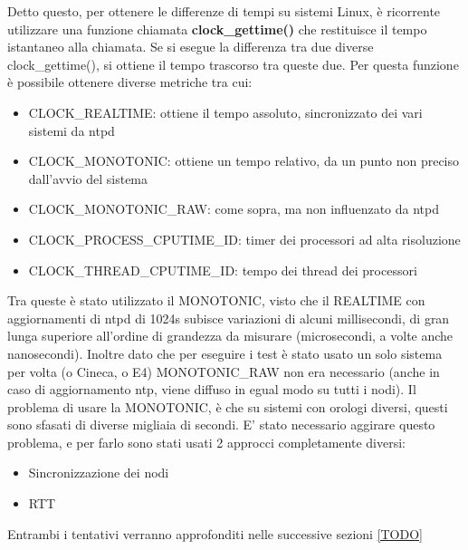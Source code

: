 Detto questo, per ottenere le differenze di tempi su sistemi Linux, è ricorrente utilizzare una funzione chiamata \textbf{clock\_gettime()} che restituisce il tempo istantaneo alla chiamata. Se si esegue la differenza tra due diverse clock\_gettime(), si ottiene il tempo trascorso tra queste due.
Per questa funzione è possibile ottenere diverse metriche tra cui:
\begin{itemize}
    \item CLOCK\_REALTIME: ottiene il tempo assoluto, sincronizzato dei vari sistemi da ntpd
    \item CLOCK\_MONOTONIC: ottiene un tempo relativo, da un punto non preciso dall'avvio del sistema
    \item CLOCK\_MONOTONIC\_RAW: come sopra, ma non influenzato da ntpd
    \item CLOCK\_PROCESS\_CPUTIME\_ID: timer dei processori ad alta risoluzione
    \item CLOCK\_THREAD\_CPUTIME\_ID: tempo dei thread dei processori
\end{itemize}
Tra queste è stato utilizzato il MONOTONIC, visto che il REALTIME con aggiornamenti di ntpd di 1024s subisce variazioni di alcuni millisecondi\cite{ntpd}, di gran lunga superiore all'ordine di grandezza da misurare (microsecondi, a volte anche nanosecondi). Inoltre dato che per eseguire i test è stato usato un solo sistema per volta (o Cineca, o E4) MONOTONIC\_RAW non era necessario (anche in caso di aggiornamento ntp, viene diffuso in egual modo su tutti i nodi).
Il problema di usare la MONOTONIC, è che su sistemi con orologi diversi, questi sono sfasati di diverse migliaia di secondi. E' stato necessario aggirare questo problema, e per farlo sono stati usati 2 approcci completamente diversi:
\begin{itemize}
    \item Sincronizzazione dei nodi
    \item RTT
\end{itemize} 

\noindent Entrambi i tentativi verranno approfonditi nelle successive sezioni \ref{TODO}


